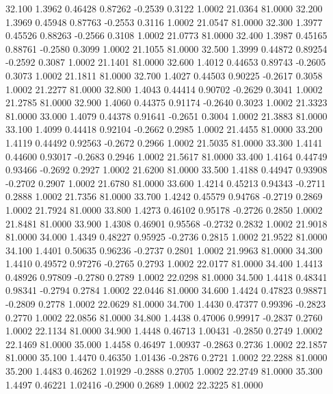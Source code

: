   32.100   1.3962   0.46428   0.87262  -0.2539   0.3122   1.0002  21.0364  81.0000
  32.200   1.3969   0.45948   0.87763  -0.2553   0.3116   1.0002  21.0547  81.0000
  32.300   1.3977   0.45526   0.88263  -0.2566   0.3108   1.0002  21.0773  81.0000
  32.400   1.3987   0.45165   0.88761  -0.2580   0.3099   1.0002  21.1055  81.0000
  32.500   1.3999   0.44872   0.89254  -0.2592   0.3087   1.0002  21.1401  81.0000
  32.600   1.4012   0.44653   0.89743  -0.2605   0.3073   1.0002  21.1811  81.0000
  32.700   1.4027   0.44503   0.90225  -0.2617   0.3058   1.0002  21.2277  81.0000
  32.800   1.4043   0.44414   0.90702  -0.2629   0.3041   1.0002  21.2785  81.0000
  32.900   1.4060   0.44375   0.91174  -0.2640   0.3023   1.0002  21.3323  81.0000
  33.000   1.4079   0.44378   0.91641  -0.2651   0.3004   1.0002  21.3883  81.0000
  33.100   1.4099   0.44418   0.92104  -0.2662   0.2985   1.0002  21.4455  81.0000
  33.200   1.4119   0.44492   0.92563  -0.2672   0.2966   1.0002  21.5035  81.0000
  33.300   1.4141   0.44600   0.93017  -0.2683   0.2946   1.0002  21.5617  81.0000
  33.400   1.4164   0.44749   0.93466  -0.2692   0.2927   1.0002  21.6200  81.0000
  33.500   1.4188   0.44947   0.93908  -0.2702   0.2907   1.0002  21.6780  81.0000
  33.600   1.4214   0.45213   0.94343  -0.2711   0.2888   1.0002  21.7356  81.0000
  33.700   1.4242   0.45579   0.94768  -0.2719   0.2869   1.0002  21.7924  81.0000
  33.800   1.4273   0.46102   0.95178  -0.2726   0.2850   1.0002  21.8481  81.0000
  33.900   1.4308   0.46901   0.95568  -0.2732   0.2832   1.0002  21.9018  81.0000
  34.000   1.4349   0.48227   0.95925  -0.2736   0.2815   1.0002  21.9522  81.0000
  34.100   1.4401   0.50635   0.96236  -0.2737   0.2801   1.0002  21.9963  81.0000
  34.300   1.4410   0.49572   0.97276  -0.2765   0.2793   1.0002  22.0177  81.0000
  34.400   1.4413   0.48926   0.97809  -0.2780   0.2789   1.0002  22.0298  81.0000
  34.500   1.4418   0.48341   0.98341  -0.2794   0.2784   1.0002  22.0446  81.0000
  34.600   1.4424   0.47823   0.98871  -0.2809   0.2778   1.0002  22.0629  81.0000
  34.700   1.4430   0.47377   0.99396  -0.2823   0.2770   1.0002  22.0856  81.0000
  34.800   1.4438   0.47006   0.99917  -0.2837   0.2760   1.0002  22.1134  81.0000
  34.900   1.4448   0.46713   1.00431  -0.2850   0.2749   1.0002  22.1469  81.0000
  35.000   1.4458   0.46497   1.00937  -0.2863   0.2736   1.0002  22.1857  81.0000
  35.100   1.4470   0.46350   1.01436  -0.2876   0.2721   1.0002  22.2288  81.0000
  35.200   1.4483   0.46262   1.01929  -0.2888   0.2705   1.0002  22.2749  81.0000
  35.300   1.4497   0.46221   1.02416  -0.2900   0.2689   1.0002  22.3225  81.0000
